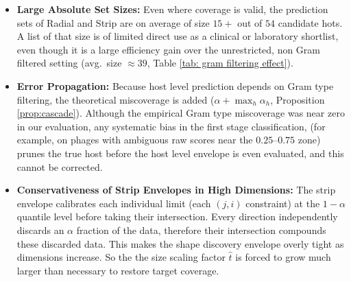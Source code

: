 \begin{itemize}
    \item \textbf{Large Absolute Set Sizes:} Even where coverage is valid, the prediction sets of Radial and Strip are on average 
           of size $15+$ out of $54$ candidate hots. A list of that size is of limited direct use as a clinical or laboratory 
           shortlist, even though it is a large efficiency gain over the unrestricted, non Gram filtered setting (avg.\ size 
           $\approx 39$, Table \ref{tab: gram filtering effect}). 

    \item \textbf{Error Propagation:} Because host level prediction depends on Gram type filtering, the theoretical miscoverage 
           is added ($\alpha + \max_h \alpha_h$, Proposition \ref{prop:cascade}). Although the empirical Gram type miscoverage 
           was near zero in our evaluation, any systematic bias in the first stage classification, (for example, on phages with 
           ambiguous raw scores near the $0.25\text{--} 0.75$ zone) prunes the true host before the host level envelope is even 
           evaluated, and this cannot be corrected.
       
     \item \textbf{Conservativeness of Strip Envelopes in High Dimensions:} The strip envelope calibrates each individual limit 
            (each $(j,i)$ constraint) at the $1-\alpha$ quantile level before taking their intersection. Every direction 
            independently discards an $\alpha$ fraction of the data, therefore their intersection compounds these discarded data. This 
            makes the shape discovery envelope overly tight as dimensions increase. So the the size scaling factor $\hat{t}$ is forced 
            to grow much larger than necessary to restore target coverage.

\end{itemize}


